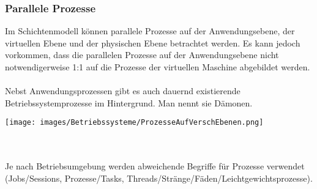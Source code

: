 \begin{minipage}{0.5\textwidth}
    \subsubsection{Parallele Prozesse}
    Im Schichtenmodell können parallele Prozesse auf der Anwendungsebene, der virtuellen Ebene und der physischen Ebene betrachtet werden. Es kann jedoch vorkommen, dass die parallelen Prozesse auf der Anwendungsebene nicht notwendigerweise 1:1 auf die Prozesse der virtuellen Maschine abgebildet werden. \\ \\
    Nebst Anwendungsprozessen gibt es auch dauernd existierende Betriebssystemprozesse im Hintergrund. Man nennt sie Dämonen. 
\end{minipage}
\hfill
\begin{minipage}{0.45\textwidth}
    \texttt{[image: images/Betriebssysteme/ProzesseAufVerschEbenen.png]}
\end{minipage} \\ \\
Je nach Betriebsumgebung werden abweichende Begriffe für Prozesse verwendet (Jobs/Sessions, Prozesse/Tasks, Threads/Stränge/Fäden/Leichtgewichtsprozesse). \newline


